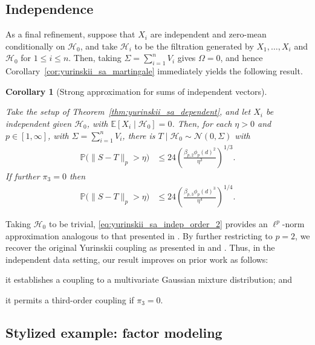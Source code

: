 \documentclass[11pt,lof]{puthesis}
\renewcommand{\P}{\ensuremath{\mathbb{P}}}
\newcommand{\E}{\ensuremath{\mathbb{E}}}
\newcommand{\cH}{\ensuremath{\mathcal{H}}}
\newcommand{\cN}{\ensuremath{\mathcal{N}}}
\theoremstyle{break}
\newtheorem{corollary}{Corollary}[section]
\theoremstyle{proof}
\begin{document}
\subsection{Independence}

As a final refinement, suppose that $X_i$ are independent and
zero-mean conditionally on $\cH_0$,
and take $\cH_i$ to be the filtration
generated by $X_1, \ldots, X_i$ and $\cH_0$ for $1 \leq i \leq n$.
Then, taking $\Sigma = \sum_{i=1}^n V_i$
gives $\Omega = 0$, and hence Corollary~\ref{cor:yurinskii_sa_martingale}
immediately yields the following result.
%
\begin{corollary}[Strong approximation for sums of independent vectors]%
  \label{cor:yurinskii_sa_indep}

  Take the setup of Theorem~\ref{thm:yurinskii_sa_dependent},
  and let $X_i$ be independent given $\cH_0$,
  with $\E[X_i \mid \cH_0] = 0$.
  Then, for each $\eta > 0$ and $p \in [1,\infty]$,
  with $\Sigma = \sum_{i=1}^n V_i$,
  there is $T \mid \cH_0 \sim \cN(0, \Sigma)$ with
  \begin{align}
    \label{eq:yurinskii_sa_indep_order_2}
    \P\big(\|S-T\|_p > \eta\big)
    &\leq 24 \left( \frac{\beta_{p,2} \phi_p(d)^2}{\eta^3} \right)^{1/3}.
  \end{align}
  If further $\pi_3 = 0$ then
  \begin{align*}
    \P\big(\|S-T\|_p > \eta\big)
    &\leq 24 \left( \frac{\beta_{p,3} \phi_p(d)^3}{\eta^4} \right)^{1/4}.
  \end{align*}
\end{corollary}

Taking $\cH_0$ to be trivial,
\eqref{eq:yurinskii_sa_indep_order_2} provides an $\ell^p$-norm approximation
analogous to that presented in \citet{belloni2019conditional}.
By further
restricting to $p=2$, we recover the original Yurinskii coupling as presented
in \citet[Theorem~1]{lecam1988} and \citet[Theorem~10]{pollard2002user}. Thus,
in the independent data setting, our result improves on prior work as follows:
\begin{inlineroman}
  \item
    it establishes a coupling to a multivariate Gaussian mixture distribution;
    and
  \item
    it permits a third-order coupling if $\pi_3=0$.
\end{inlineroman}

\subsection{Stylized example: factor modeling}
\label{sec:yurinskii_factor}
\end{document}
